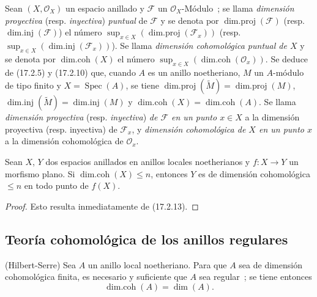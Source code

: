 \begin{env}[17.2.14]
\label{0.17.2.14-es}
Sean $(X,\mathscr{O}_X)$ un espacio anillado y $\mathscr{F}$ un
$\mathscr{O}_X$-Módulo~; se llama \emph{dimensión proyectiva} (resp.
\emph{inyectiva}) \emph{puntual} de $\mathscr{F}$ y se denota por
$\operatorname{dim.proj}(\mathscr{F})$ (resp.
$\operatorname{dim.inj}(\mathscr{F})$) el número
$\sup_{x\in X}(\operatorname{dim.proj}(\mathscr{F}_x))$ (resp.
$\sup_{x\in X}(\operatorname{dim.inj}(\mathscr{F}_x))$). Se llama
\emph{dimensión cohomológica puntual de $X$} y se denota por
$\operatorname{dim.coh}(X)$ el número
$\sup_{x\in X}(\operatorname{dim.coh}(\mathscr{O}_x))$. Se deduce de
(17.2.5) y (17.2.10) que, cuando $A$ es un anillo noetheriano, $M$ un
$A$-módulo de tipo finito y $X=\operatorname{Spec}(A)$, se tiene
$\operatorname{dim.proj}(\widetilde{M})=\operatorname{dim.proj}(M)$,
$\operatorname{dim.inj}(\widetilde{M})=\operatorname{dim.inj}(M)$ y
$\operatorname{dim.coh}(X)=\operatorname{dim.coh}(A)$. Se llama
\emph{dimensión proyectiva} (resp. \emph{inyectiva}) \emph{de $\mathscr{F}$ en
un punto $x\in X$} a la dimensión proyectiva (resp. inyectiva) de
$\mathscr{F}_x$, y \emph{dimensión cohomológica de $X$ en un punto $x$} a la
dimensión cohomológica de $\mathscr{O}_x$.
\end{env}

\begin{proposition}[17.2.15]
\label{0.17.2.15-es}
Sean $X$, $Y$ dos espacios anillados en anillos locales noetherianos y
$f:X\longrightarrow Y$ un morfismo plano. Si
$\operatorname{dim.coh}(X)\leq n$, entonces $Y$ es de dimensión cohomológica
$\leq n$ en todo punto de $f(X)$.
\end{proposition}

\begin{proof}
Esto resulta inmediatamente de (17.2.13).
\end{proof}

\subsection{Teoría cohomológica de los anillos regulares}
\label{subsection:0.17.3-es}

\begin{theorem}[17.3.1]
\label{0.17.3.1-es}
\textnormal{(Hilbert-Serre)} Sea $A$ un anillo local noetheriano. Para que $A$
sea de dimensión cohomológica finita, es necesario y suficiente que $A$ sea
regular~; se tiene entonces
\begin{equation}
\label{0.17.3.1.1-es}
\tag{17.3.1.1}
  \operatorname{dim.coh}(A)=\dim(A).
\end{equation}
\end{theorem}

